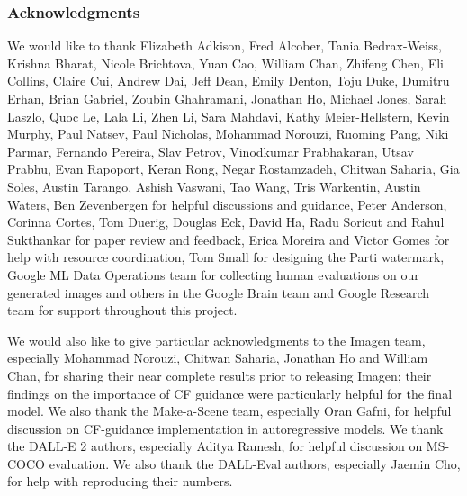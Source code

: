 \subsubsection*{Acknowledgments}
We would like to thank Elizabeth Adkison, Fred Alcober, Tania Bedrax-Weiss, Krishna Bharat, Nicole Brichtova, Yuan Cao, William Chan, Zhifeng Chen, Eli Collins, Claire Cui, Andrew Dai, Jeff Dean, Emily Denton, Toju Duke, Dumitru Erhan, Brian Gabriel, Zoubin Ghahramani, Jonathan Ho, Michael Jones, Sarah Laszlo, Quoc Le, Lala Li, Zhen Li, Sara Mahdavi, Kathy Meier-Hellstern, Kevin Murphy, Paul Natsev, Paul Nicholas, Mohammad Norouzi, Ruoming Pang, Niki Parmar, Fernando Pereira, Slav Petrov, Vinodkumar Prabhakaran, Utsav Prabhu, Evan Rapoport, Keran Rong, Negar Rostamzadeh, Chitwan Saharia, Gia Soles, Austin Tarango, Ashish Vaswani, Tao Wang, Tris Warkentin, Austin Waters, Ben Zevenbergen for helpful discussions and guidance,
Peter Anderson, Corinna Cortes, Tom Duerig, Douglas Eck, David Ha, Radu Soricut and Rahul Sukthankar for paper review and feedback,
Erica Moreira and Victor Gomes for help with resource coordination,
Tom Small for designing the Parti watermark,
Google ML Data Operations team for collecting human evaluations on our generated images
and others in the Google Brain team and Google Research team for support throughout this project.

We would also like to give particular acknowledgments to the Imagen team, especially Mohammad Norouzi, Chitwan Saharia, Jonathan Ho and William Chan, for sharing their near complete results prior to releasing Imagen; their findings on the importance of CF guidance were particularly helpful for the final \bdraw model. We also thank the Make-a-Scene team, especially Oran Gafni, for helpful discussion on CF-guidance implementation in autoregressive models. We thank the DALL-E 2 authors, especially Aditya Ramesh, for helpful discussion on MS-COCO evaluation. We also thank the DALL-Eval authors, especially Jaemin Cho, for help with reproducing their numbers.